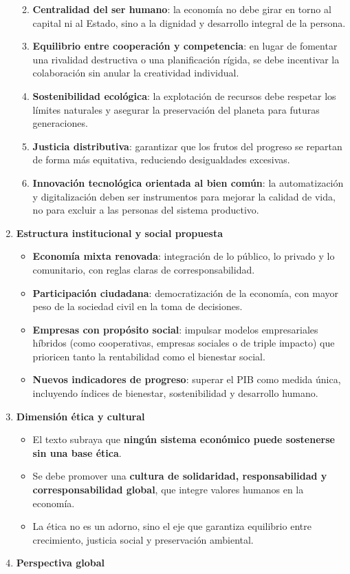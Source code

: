 \documentclass[12pt]{book} %
\providecommand{\tightlist}{%
  \setlength{\itemsep}{0pt}\setlength{\parskip}{0pt}}
\begin{document}
\begin{enumerate}
  \begin{enumerate}
  \def\labelenumii{\arabic{enumii}.}
  \tightlist
  \item
    \textbf{Centralidad del ser humano}: la economía no debe girar en
    torno al capital ni al Estado, sino a la dignidad y desarrollo
    integral de la persona.
  \item
    \textbf{Equilibrio entre cooperación y competencia}: en lugar de
    fomentar una rivalidad destructiva o una planificación rígida, se
    debe incentivar la colaboración sin anular la creatividad
    individual.
  \item
    \textbf{Sostenibilidad ecológica}: la explotación de recursos debe
    respetar los límites naturales y asegurar la preservación del
    planeta para futuras generaciones.
  \item
    \textbf{Justicia distributiva}: garantizar que los frutos del
    progreso se repartan de forma más equitativa, reduciendo
    desigualdades excesivas.
  \item
    \textbf{Innovación tecnológica orientada al bien común}: la
    automatización y digitalización deben ser instrumentos para mejorar
    la calidad de vida, no para excluir a las personas del sistema
    productivo.
  \end{enumerate}
\item
  \textbf{Estructura institucional y social propuesta}

  \begin{itemize}
  \tightlist
  \item
    \textbf{Economía mixta renovada}: integración de lo público, lo
    privado y lo comunitario, con reglas claras de corresponsabilidad.
  \item
    \textbf{Participación ciudadana}: democratización de la economía,
    con mayor peso de la sociedad civil en la toma de decisiones.
  \item
    \textbf{Empresas con propósito social}: impulsar modelos
    empresariales híbridos (como cooperativas, empresas sociales o de
    triple impacto) que prioricen tanto la rentabilidad como el
    bienestar social.
  \item
    \textbf{Nuevos indicadores de progreso}: superar el PIB como medida
    única, incluyendo índices de bienestar, sostenibilidad y desarrollo
    humano.
  \end{itemize}
\item
  \textbf{Dimensión ética y cultural}

  \begin{itemize}
  \tightlist
  \item
    El texto subraya que \textbf{ningún sistema económico puede
    sostenerse sin una base ética}.
  \item
    Se debe promover una \textbf{cultura de solidaridad, responsabilidad
    y corresponsabilidad global}, que integre valores humanos en la
    economía.
  \item
    La ética no es un adorno, sino el eje que garantiza equilibrio entre
    crecimiento, justicia social y preservación ambiental.
  \end{itemize}
\item
  \textbf{Perspectiva global}


\end{enumerate}
\end{document}
